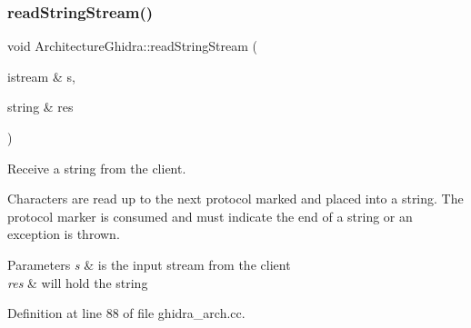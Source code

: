 \subsubsection{\texorpdfstring{readStringStream()}{readStringStream()}}
{\footnotesize\ttfamily void Architecture\+Ghidra\+::read\+String\+Stream (\begin{DoxyParamCaption}\item[{istream \&}]{s,  }\item[{string \&}]{res }\end{DoxyParamCaption})\hspace{0.3cm}{\ttfamily [static]}}



Receive a string from the client. 

Characters are read up to the next protocol marked and placed into a string. The protocol marker is consumed and must indicate the end of a string or an exception is thrown. 
\begin{DoxyParams}{Parameters}
{\em s} & is the input stream from the client \\
\hline
{\em res} & will hold the string \\
\hline
\end{DoxyParams}


Definition at line 88 of file ghidra\+\_\+arch.\+cc.

